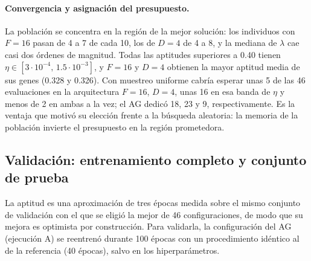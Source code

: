 \paragraph{Convergencia y asignación del presupuesto.} La población se concentra en la región de la mejor solución: los individuos con $F=16$ pasan de 4 a 7 de cada 10, los de $D=4$ de 4 a 8, y la mediana de $\lambda$ cae casi dos órdenes de magnitud. Todas las aptitudes superiores a 0.40 tienen $\eta\in[3\cdot10^{-4},\,1.5\cdot10^{-3}]$, y $F=16$ y $D=4$ obtienen la mayor aptitud media de sus genes (0.328 y 0.326). Con muestreo uniforme cabría esperar unas 5 de las 46 evaluaciones en la arquitectura $F=16$, $D=4$, unas 16 en esa banda de $\eta$ y menos de 2 en ambas a la vez; el AG dedicó 18, 23 y 9, respectivamente. Es la ventaja que motivó su elección frente a la búsqueda aleatoria: la memoria de la población invierte el presupuesto en la región prometedora.

\subsection{Validación: entrenamiento completo y conjunto de prueba}\label{subsec:validacion-ag}

La aptitud es una aproximación de tres épocas medida sobre el mismo conjunto de validación con el que se eligió la mejor de 46 configuraciones, de modo que su mejora es optimista por construcción. Para validarla, la configuración del AG (ejecución A) se reentrenó durante 100 épocas con un procedimiento idéntico al de la referencia (40 épocas), salvo en los hiperparámetros.

